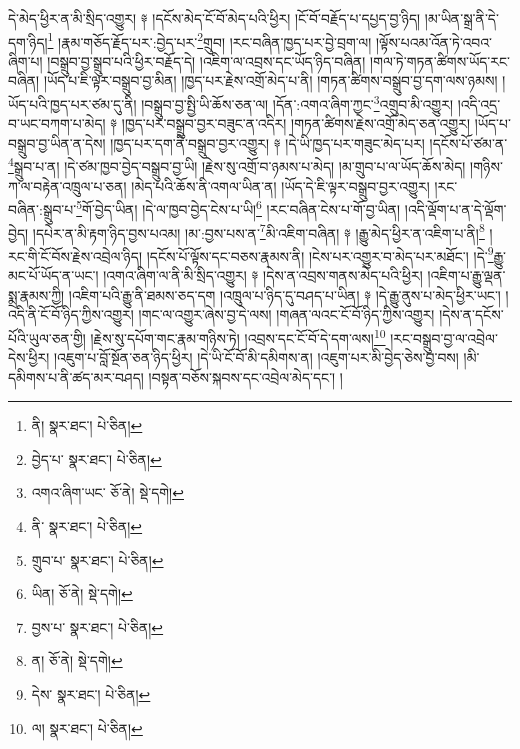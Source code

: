 དེ་མེད་ཕྱིར་ན་མི་སྲིད་འགྱུར། ༈ །དངོས་མེད་ངོ་བོ་མེད་པའི་ཕྱིར། །ངོ་བོ་བརྗོད་པ་དཔྱད་བྱ་ཉིད། །མ་ཡིན་སྒྲ་ནི་དེ་དག་ཉིད།\footnote{ནི།  སྣར་ཐང་།  པེ་ཅིན། } །རྣམ་གཅོད་རྗོད་པར་:བྱེད་པར་\footnote{བྱེད་པ་  སྣར་ཐང་།  པེ་ཅིན། }གྲུབ། །རང་བཞིན་ཁྱད་པར་བྱེ་བྲག་ལ། །ལྟོས་པའམ་འོན་ཏེ་འབའ་ཞིག་པ། །བསྒྲུབ་བྱ་སྒྲུབ་པའི་ཕྱིར་བརྗོད་དེ། །འཇིག་ལ་འབྲས་དང་ཡོད་ཉིད་བཞིན། །གལ་ཏེ་གཏན་ཚིགས་ཡོད་རང་བཞིན། །ཡོད་པ་ཇི་ལྟར་བསྒྲུབ་བྱ་མིན། །ཁྱད་པར་རྗེས་འགྲོ་མེད་པ་ནི། །གཏན་ཚིགས་བསྒྲུབ་བྱ་དག་ལས་ཉམས། །ཡོད་པའི་ཁྱད་པར་ཙམ་དུ་ནི། །བསྒྲུབ་བྱ་སྤྱི་ཡི་ཆོས་ཅན་ལ། །དོན་:འགའ་ཞིག་ཀྱང་\footnote{འགའ་ཞིག་ཡང་  ཅོ་ནེ།  སྡེ་དགེ། }འགྲུབ་མི་འགྱུར། །འདི་འདྲ་བ་ཡང་བཀག་པ་མེད། ༈ །ཁྱད་པར་བསྒྲུབ་བྱར་བཟུང་ན་འདིར། །གཏན་ཚིགས་རྗེས་འགྲོ་མེད་ཅན་འགྱུར། །ཡོད་པ་བསྒྲུབ་བྱ་ཡིན་ན་དེས། །ཁྱད་པར་དག་ནི་བསྒྲུབ་བྱར་འགྱུར། ༈ །དེ་ཡི་ཁྱད་པར་གཟུང་མེད་པར། །དངོས་པོ་ཙམ་ན་\footnote{ནི་  སྣར་ཐང་།  པེ་ཅིན། }སྒྲུབ་པ་ན། །དེ་ཙམ་ཁྱབ་བྱེད་བསྒྲུབ་བྱ་ཡི། །རྗེས་སུ་འགྲོ་བ་ཉམས་པ་མེད། །མ་གྲུབ་པ་ལ་ཡོད་ཆོས་མེད། །གཉིས་ཀ་ལ་བརྟེན་འཁྲུལ་པ་ཅན། །མེད་པའི་ཆོས་ནི་འགལ་ཡིན་ན། །ཡོད་དེ་ཇི་ལྟར་བསྒྲུབ་བྱར་འགྱུར། །རང་བཞིན་:སྒྲུབ་པ་\footnote{གྲུབ་པ་  སྣར་ཐང་།  པེ་ཅིན། }གོ་བྱེད་ཡིན། །དེ་ལ་ཁྱབ་བྱེད་ངེས་པ་ཡི།\footnote{ཡིན།  ཅོ་ནེ།  སྡེ་དགེ། } །རང་བཞིན་ངེས་པ་གོ་བྱ་ཡིན། །འདི་ལྡོག་པ་ན་དེ་ལྡོག་བྱེད། །དཔེར་ན་མི་རྟག་ཉིད་བྱས་པའམ། །མ་:བྱས་པས་ན་\footnote{བྱས་པ་  སྣར་ཐང་།  པེ་ཅིན། }མི་འཇིག་བཞིན། ༈ །རྒྱུ་མེད་ཕྱིར་ན་འཇིག་པ་ནི།\footnote{ན།  ཅོ་ནེ།  སྡེ་དགེ། } །རང་གི་ངོ་བོས་རྗེས་འབྲེལ་ཉིད། །དངོས་པོ་ལྟོས་དང་བཅས་རྣམས་ནི། །ངེས་པར་འགྱུར་བ་མེད་པར་མཐོང་། །དེ་\footnote{དེས་  སྣར་ཐང་།  པེ་ཅིན། }རྒྱུ་མང་པོ་ཡོད་ན་ཡང་། །འགའ་ཞིག་ལ་ནི་མི་སྲིད་འགྱུར། ༈ །དེས་ན་འབྲས་གནས་མེད་པའི་ཕྱིར། །འཇིག་པ་རྒྱུ་ལྡན་སྨྲ་རྣམས་ཀྱི། །འཇིག་པའི་རྒྱུ་ནི་ཐམས་ཅད་དག །འཁྲུལ་པ་ཉིད་དུ་བཤད་པ་ཡིན། ༈ །དེ་རྒྱུ་ནུས་པ་མེད་ཕྱིར་ཡང་། །འདི་ནི་ངོ་བོ་ཉིད་ཀྱིས་འགྱུར། །གང་ལ་འགྱུར་ཞེས་བྱ་དེ་ལས། །གཞན་ལའང་ངོ་བོ་ཉིད་ཀྱིས་འགྱུར། །དེས་ན་དངོས་པོའི་ཡུལ་ཅན་གྱི། །རྗེས་སུ་དཔོག་གང་རྣམ་གཉིས་ཏེ། །འབྲས་དང་ངོ་བོ་དེ་དག་ལས།\footnote{ལ།  སྣར་ཐང་།  པེ་ཅིན། } །རང་བསྒྲུབ་བྱ་ལ་འབྲེལ་དེས་ཕྱིར། །འཇུག་པ་བློ་སྔོན་ཅན་ཉིད་ཕྱིར། །དེ་ཡི་ངོ་བོ་མི་དམིགས་ན། །འཇུག་པར་མི་བྱེད་ཅེས་བྱ་བས། །མི་དམིགས་པ་ནི་ཚད་མར་བཤད། །བསྟན་བཅོས་སྐབས་དང་འབྲེལ་མེད་དང་། །
